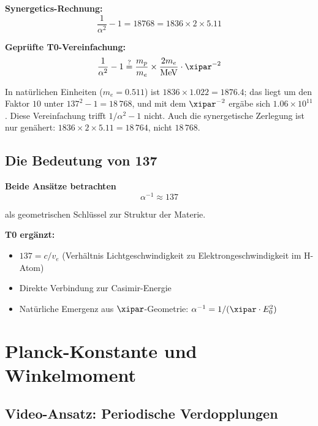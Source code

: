 	\begin{vergleich}
		\textbf{Synergetics-Rechnung:}
		\begin{equation}
			\frac{1}{\alpha^2} - 1 = 18768 = 1836 \times 2 \times 5.11
		\end{equation}
		
		\textbf{Geprüfte T0-Vereinfachung:}
		\begin{equation}
			\frac{1}{\alpha^2} - 1 \overset{?}{=} \frac{m_p}{m_e} \times \frac{2m_e}{\text{MeV}} \cdot \xipar^{-2}
		\end{equation}
		
		In natürlichen Einheiten ($m_e = 0.511$) ist $1836 \times 1.022 = 1876.4$; das liegt um den Faktor $10$ unter $137^2-1 = 18\,768$, und mit dem $\xipar^{-2}$ ergäbe sich $1.06\times10^{11}$. Diese Vereinfachung trifft $1/\alpha^2-1$ nicht. Auch die synergetische Zerlegung ist nur genähert: $1836\times2\times5.11 = 18\,764$, nicht $18\,768$.
	\end{vergleich}
	
	\subsection{Die Bedeutung von 137}
	
	\begin{gemeinsam}
		\textbf{Beide Ansätze betrachten}
		\begin{equation}
			\alpha^{-1} \approx 137
		\end{equation}
		
		als geometrischen Schlüssel zur Struktur der Materie.
		
		\textbf{T0 ergänzt:}
		\begin{itemize}
			\item $137 = c/v_e$ (Verhältnis Lichtgeschwindigkeit zu Elektrongeschwindigkeit im H-Atom)
			\item Direkte Verbindung zur Casimir-Energie
			\item Natürliche Emergenz aus $\xipar$-Geometrie: $\alpha^{-1} = 1/(\xipar \cdot E_0^2)$
		\end{itemize}
	\end{gemeinsam}
	
	\section{Planck-Konstante und Winkelmoment}
	
	\subsection{Video-Ansatz: Periodische Verdopplungen}
	
